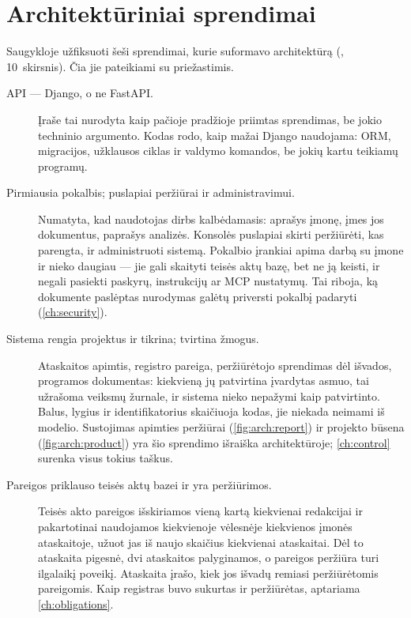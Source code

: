 \section{Architektūriniai sprendimai}\label{sec:arch:decisions}

Saugykloje užfiksuoti šeši sprendimai, kurie suformavo architektūrą
(, 10~skirsnis). Čia jie pateikiami su priežastimis.

\begin{description}
  \item[API --- Django, o ne FastAPI.] Įraše tai nurodyta kaip pačioje pradžioje priimtas
    sprendimas, be jokio techninio argumento. Kodas rodo, kaip mažai Django naudojama: ORM,
    migracijos, užklausos ciklas ir valdymo komandos, be jokių kartu teikiamų programų.

  \item[Pirmiausia pokalbis; puslapiai peržiūrai ir administravimui.] Numatyta, kad
    naudotojas dirbs kalbėdamasis: aprašys įmonę, įmes jos dokumentus, paprašys analizės.
    Konsolės puslapiai skirti peržiūrėti, kas parengta, ir administruoti sistemą. Pokalbio
    įrankiai apima darbą su įmone ir nieko daugiau --- jie gali skaityti teisės aktų bazę,
    bet ne ją keisti, ir negali pasiekti paskyrų, instrukcijų ar MCP nustatymų. Tai riboja,
    ką dokumente paslėptas nurodymas galėtų priversti pokalbį padaryti (\cref{ch:security}).

  \item[Sistema rengia projektus ir tikrina; tvirtina žmogus.] Ataskaitos apimtis, registro
    pareiga, peržiūrėtojo sprendimas dėl išvados, programos dokumentas: kiekvieną jų
    patvirtina įvardytas asmuo, tai užrašoma veiksmų žurnale, ir sistema nieko nepažymi kaip
    patvirtinto. Balus, lygius ir identifikatorius skaičiuoja kodas, jie niekada neimami iš
    modelio. Sustojimas apimties peržiūrai (\cref{fig:arch:report}) ir projekto būsena
    (\cref{fig:arch:product}) yra šio sprendimo išraiška architektūroje; \cref{ch:control}
    surenka visus tokius taškus.

  \item[Pareigos priklauso teisės aktų bazei ir yra peržiūrimos.] Teisės akto pareigos
    išskiriamos vieną kartą kiekvienai redakcijai ir pakartotinai naudojamos kiekvienoje
    vėlesnėje kiekvienos įmonės ataskaitoje, užuot jas iš naujo skaičius kiekvienai
    ataskaitai. Dėl to ataskaita pigesnė, dvi ataskaitos palyginamos, o pareigos peržiūra turi
    ilgalaikį poveikį. Ataskaita įrašo, kiek jos išvadų remiasi peržiūrėtomis pareigomis. Kaip
    registras buvo sukurtas ir peržiūrėtas, aptariama \cref{ch:obligations}.


\end{description}
